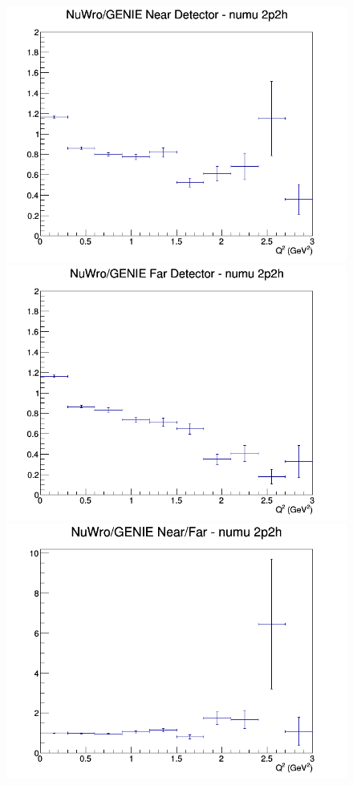 \documentclass[12pt]{article}
\begin{document}
\begin{figure}[h]
\endminipage
\newline
{}
\includegraphics[width=\linewidth]{eff_Q2/GAr/ratios/2p2h_NuWro_GENIE_numu_near_Q2.png}
\endminipage
{}
\includegraphics[width=\linewidth]{eff_Q2/GAr/ratios/2p2h_NuWro_GENIE_numu_far_Q2.png}
\endminipage
{}
\includegraphics[width=\linewidth]{eff_Q2/GAr/ratios/2p2h_NuWro_GENIE_numu_NF_Q2.png}
\endminipage
\newline
\end{figure}
\clearpage
\end{document}
